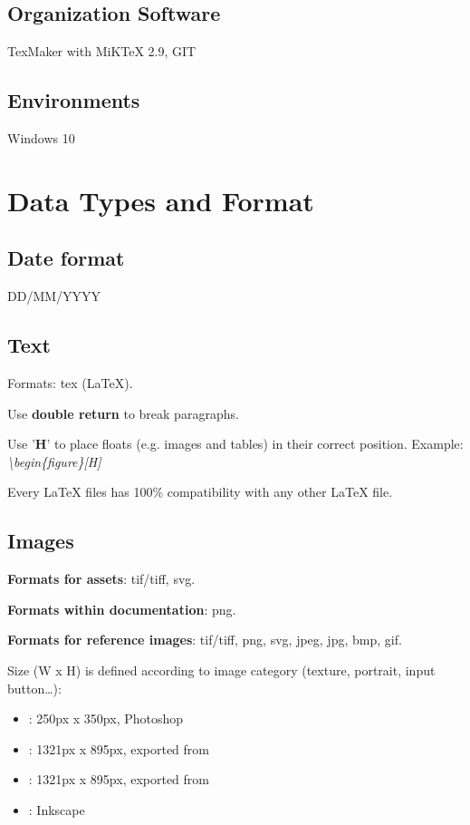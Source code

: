 \documentclass[12pt]{article}
\begin{document}
\subsection{Organization Software}
TexMaker with MiKTeX 2.9, GIT

\subsection{Environments}
Windows 10

\section{Data Types and Format}

\subsection{Date format}
DD/MM/YYYY

\subsection{Text}
Formats: tex (LaTeX).


Use \textbf{double return} to break paragraphs.

Use '\textbf{H}' to place floats (e.g. images and tables) in their correct position. Example: \textit{\textbackslash{}begin\{figure\}[H]}

Every LaTeX files has 100\% compatibility with any other LaTeX file.

\subsection{Images}
\textbf{Formats for assets}: tif/tiff, svg.

\textbf{Formats within documentation}: png.

\textbf{Formats for reference images}: tif/tiff, png, svg, jpeg, jpg, bmp, gif.

Size (W x H) is defined according to image category (texture, portrait, input button…):
\begin{itemize}
	\item \textbf{}: 250px x 350px, Photoshop
	\item \textbf{}: 1321px x 895px, exported from 
	\item \textbf{}: 1321px x 895px, exported from 
	\item \textbf{}: Inkscape
\end{itemize}
\end{document}
